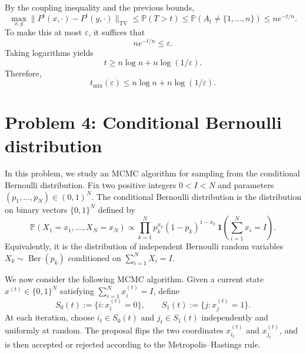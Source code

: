 \documentclass[answers,12pt,addpoints]{exam}
\newcommand{\TV}{\mathrm{TV}}
\begin{document}
\begin{enumerate}
  \begin{solution}
  By the coupling inequality and the previous bounds,
  \[
  \max_{x,y}\|P^t(x,\cdot)-P^t(y,\cdot)\|_{\TV}
  \le \mathbb{P}(T>t)
  \le \mathbb{P}(A_t\neq\{1,\dots,n\})
  \le ne^{-t/n}.
  \]
  To make this at most $\varepsilon$, it suffices that
  \[
  ne^{-t/n} \le \varepsilon.
  \]
  Taking logarithms yields
  \[
  t \ge n\log n + n\log(1/\varepsilon).
  \]
  Therefore,
  \[
  t_{\mathrm{mix}}(\varepsilon) \le n\log n + n\log(1/\varepsilon).
  \]
  \end{solution}
\end{enumerate}

\section*{Problem 4: Conditional Bernoulli distribution}

In this problem, we study an MCMC algorithm for sampling from the conditional Bernoulli distribution. Fix two positive integers $0 < I < N$ and parameters $(p_1,\dots,p_N) \in (0,1)^N$. The conditional Bernoulli distribution is the distribution on binary vectors $\{0,1\}^N$ defined by
\[
\mathbb{P}(X_1=x_1,\dots,X_N=x_N)
\propto \prod_{k=1}^N p_k^{x_k}(1-p_k)^{1-x_k}\,\mathbf{1}\!\left(\sum_{i=1}^N x_i=I\right).
\]
Equivalently, it is the distribution of independent Bernoulli random variables $X_k \sim \operatorname{Ber}(p_k)$ conditioned on $\sum_{i=1}^N X_i = I$.

We now consider the following MCMC algorithm. Given a current state $x^{(t)} \in \{0,1\}^N$ satisfying $\sum_{i=1}^N x_i^{(t)} = I$, define
\[
S_0(t):=\{i:x_i^{(t)}=0\}, \qquad S_1(t):=\{j:x_j^{(t)}=1\}.
\]
At each iteration, choose $i_t \in S_0(t)$ and $j_t \in S_1(t)$ independently and uniformly at random. The proposal flips the two coordinates $x^{(t)}_{i_t}$ and $x^{(t)}_{j_t}$, and is then accepted or rejected according to the Metropolis--Hastings rule.
\end{document}
